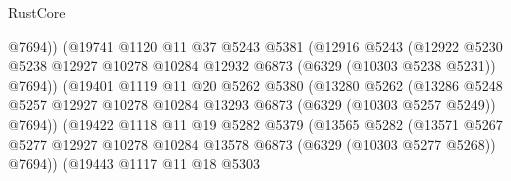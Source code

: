\begin{lexlean}{RustCore}
\begin{coremodule}
                                  @7694))
                              (@19741
                                @1120
                                @11
                                @37
                                @5243
                                @5381
                                (@12916
                                  @5243
                                  (@12922
                                    @5230
                                    @5238
                                    @12927
                                    @10278
                                    @10284
                                    @12932
                                    @6873
                                    (@6329 (@10303 @5238 @5231))
                                    @7694))
                                (@19401
                                  @1119
                                  @11
                                  @20
                                  @5262
                                  @5380
                                  (@13280
                                    @5262
                                    (@13286
                                      @5248
                                      @5257
                                      @12927
                                      @10278
                                      @10284
                                      @13293
                                      @6873
                                      (@6329 (@10303 @5257 @5249))
                                      @7694))
                                  (@19422
                                    @1118
                                    @11
                                    @19
                                    @5282
                                    @5379
                                    (@13565
                                      @5282
                                      (@13571
                                        @5267
                                        @5277
                                        @12927
                                        @10278
                                        @10284
                                        @13578
                                        @6873
                                        (@6329 (@10303 @5277 @5268))
                                        @7694))
                                    (@19443
                                      @1117
                                      @11
                                      @18
                                      @5303

\end{coremodule}
\end{lexlean}

